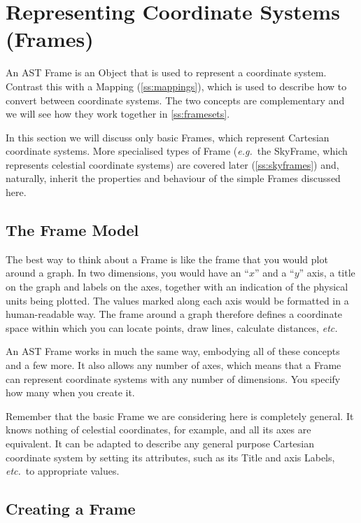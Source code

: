 \documentclass[twoside,11pt]{article}
\newcommand{\secref}[1]{\S\ref{#1}}
\renewcommand{\secref}[1]{\ref{#1}}
\begin{document}
\cleardoublepage
\section{\label{ss:frames}Representing Coordinate Systems (Frames)}

An AST Frame is an Object that is used to represent a coordinate
system. Contrast this with a Mapping (\secref{ss:mappings}), which is
used to describe how to convert between coordinate systems. The two
concepts are complementary and we will see how they work together in
\secref{ss:framesets}.

In this section we will discuss only basic Frames, which represent
Cartesian coordinate systems. More specialised types of Frame
({\em{e.g.}}\ the SkyFrame, which represents celestial coordinate
systems) are covered later (\secref{ss:skyframes}) and, naturally,
inherit the properties and behaviour of the simple Frames discussed
here.

\subsection{The Frame Model}

The best way to think about a Frame is like the frame that you would
plot around a graph. In two dimensions, you would have an ``$x$'' and
a ``$y$'' axis, a title on the graph and labels on the axes, together
with an indication of the physical units being plotted. The values
marked along each axis would be formatted in a human-readable way. The
frame around a graph therefore defines a coordinate space within which
you can locate points, draw lines, calculate distances, {\em{etc.}}

An AST Frame works in much the same way, embodying all of these
concepts and a few more. It also allows any number of axes, which
means that a Frame can represent coordinate systems with any number of
dimensions. You specify how many when you create it.

Remember that the basic Frame we are considering here is completely
general.  It knows nothing of celestial coordinates, for example, and
all its axes are equivalent. It can be adapted to describe any general
purpose Cartesian coordinate system by setting its attributes, such as
its Title and axis Labels, {\em{etc.}}\ to appropriate values.

\subsection{\label{ss:creatingframes}Creating a Frame}
\end{document}
